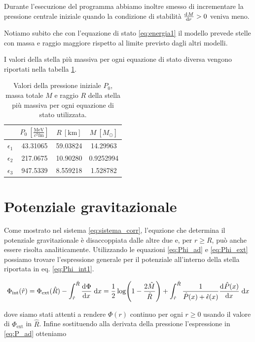 \documentclass[a4paper, titlepage]{article}
\newcommand{\Punit}[0]{\frac{\unit{\mega\electronvolt}}{c^2 \unit{\femto\meter}}}
\begin{document}
Durante l'esecuzione del programma abbiamo inoltre smesso di incrementare la pressione centrale iniziale quando la condizione di stabilità $\dv[]{M}{r} > 0$ veniva meno.

Notiamo subito che con l'equazione di stato \ref{eq:energia1} il modello prevede stelle con massa e raggio maggiore rispetto al limite previsto dagli altri modelli.

I valori della stella più massiva per ogni equazione di stato diversa vengono riportati nella tabella \ref{tab:Mgrosso}.

\begin{table}[h!]
    \centering
    \begin{tabular}{c|c|c|c}
        & $P_0~[\Punit]$ & $R~[\unit{\kilo\meter}]$ & $M~[M_\odot]$ \\
         \hline
         $\epsilon_1$ & 43.31065 & 59.03824 & 14.29963 \\
         \hline
         $\epsilon_2$ & 217.0675 & 10.90280 & 0.9252994 \\
         \hline
         $\epsilon_3$ & 947.5339 & 8.559218 & 1.528782 \\
    \end{tabular}
    \caption{Valori della pressione iniziale $P_0$, massa totale $M$ e raggio $R$ della stella più massiva per ogni equazione di stato utilizzata.}
    \label{tab:Mgrosso}
\end{table}


\section{Potenziale gravitazionale}

Come mostrato nel sistema \ref{eq:sistema_corr}, l'equzione che determina il potenziale gravitazionale è disaccoppiata dalle altre due e, per $r \geq R$, può anche essere risolta analiticamente.
Utilizzando le equazioni \ref{eq:Phi_ad} e \ref{eq:Phi_ext} possiamo trovare l'espressione generale per il potenziale all'interno della stella riportata in eq. \ref{eq:Phi_int1}.

\begin{equation}
    \Phi_\text{int} (\hat r) =
    \Phi_\text{ext} (\hat R) - \int_{\hat r}^{\hat R} \dv[]{\Phi}{x} \;\mathrm{d}x =
    \frac{1}{2} \log(1 - \frac{2 \hat M}{\hat R}) + \int_{\hat r}^{\hat R} \frac{1}{\hat P (x) + \hat \epsilon (x)} \dv[]{\hat P (x)}{x} \;\mathrm{d}x
    \label{eq:Phi_int1}
\end{equation}

dove siamo stati attenti a rendere $\Phi (r)$ continuo per ogni $r \geq 0$ usando il valore di $\Phi_\text{ext}$ in $\hat R$. Infine sostituendo alla derivata della pressione l'espressione in \ref{eq:P_ad} otteniamo
\end{document}

